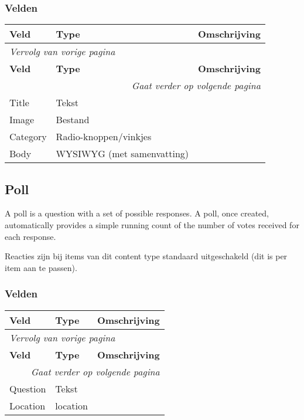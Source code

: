 \subsubsection{Velden}
  \begin{longtable}{| p{3.75cm}|p{3.75cm}|p{7.50cm}|}
  \hline
  \rowcolor{tableheader}
  \textbf{Veld} & \textbf{Type} & \textbf{Omschrijving}  \tabularnewline
  \hline
\endfirsthead
\multicolumn{3}{l}{\textit{Vervolg van vorige pagina}} \\
\hline
\rowcolor{tableheader}
  \textbf{Veld} & \textbf{Type} & \textbf{Omschrijving}  \tabularnewline
  \hline
\hline
\endhead
\multicolumn{3}{r}{\textit{Gaat verder op volgende pagina}} \\
\endfoot
\hline
\endlastfoot
  \raggedright{Title} & \raggedright{Tekst} & \raggedright{}  \tabularnewline
  \hline
  \raggedright{Image} & \raggedright{Bestand} & \raggedright{}  \tabularnewline
  \hline
  \raggedright{Category} & \raggedright{Radio-knoppen/vinkjes} & \raggedright{}  \tabularnewline
  \hline
  \raggedright{Body} & \raggedright{WYSIWYG (met samenvatting)} & \raggedright{}  \tabularnewline
  \hline
  \end{longtable}

\subsection{Poll}
\label{sec:content-poll}
A poll is a question with a set of possible responses. A poll, once created, automatically provides a simple running count of the number of votes received for each response.

Reacties zijn bij items van dit content type standaard uitgeschakeld (dit is per item aan te passen).

\subsubsection{Velden}
  \begin{longtable}{| p{3.75cm}|p{3.75cm}|p{7.50cm}|}
  \hline
  \rowcolor{tableheader}
  \textbf{Veld} & \textbf{Type} & \textbf{Omschrijving}  \tabularnewline
  \hline
\endfirsthead
\multicolumn{3}{l}{\textit{Vervolg van vorige pagina}} \\
\hline
\rowcolor{tableheader}
  \textbf{Veld} & \textbf{Type} & \textbf{Omschrijving}  \tabularnewline
  \hline
\hline
\endhead
\multicolumn{3}{r}{\textit{Gaat verder op volgende pagina}} \\
\endfoot
\hline
\endlastfoot
  \raggedright{Question} & \raggedright{Tekst} & \raggedright{}  \tabularnewline
  \hline
  \raggedright{Location} & \raggedright{location} & \raggedright{}  \tabularnewline
  \hline
  \end{longtable}

